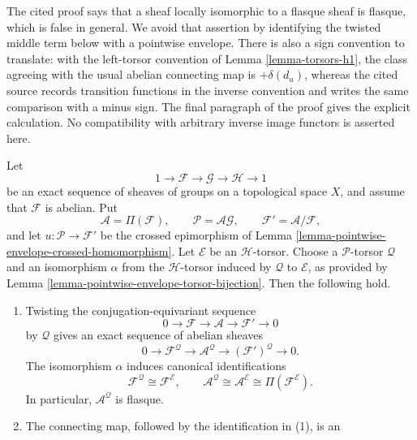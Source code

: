 \begin{lemma}
\label{lemma-pointwise-envelope-degree-two-boundary}
\begin{reference}
\cite[Chapter III, \S 3.4, proof of Proposition 3.4.2 and Remark 1,
pp. 164--165]{Tohoku}
\end{reference}
\begin{history}
The cited proof says that a sheaf locally isomorphic to a flasque sheaf is
flasque, which is false in general. We avoid that assertion by identifying
the twisted middle term below with a pointwise envelope. There is also a
sign convention to translate: with the left-torsor convention of
Lemma \ref{lemma-torsors-h1}, the class agreeing with the usual abelian
connecting map is $+\delta(d_u)$, whereas the cited source records transition
functions in the inverse convention and writes the same comparison with a
minus sign. The final paragraph of the proof gives the explicit calculation.
No compatibility with arbitrary inverse image functors is asserted here.
\end{history}
Let
$$
1\longrightarrow\mathcal F\longrightarrow\mathcal G
\longrightarrow\mathcal H\longrightarrow 1
$$
be an exact sequence of sheaves of groups on a topological space $X$, and
assume that $\mathcal F$ is abelian. Put
$$
\mathcal A=\Pi(\mathcal F),\qquad
\mathcal P=\mathcal A\mathcal G,\qquad
\mathcal F'=\mathcal A/\mathcal F,
$$
and let $u:\mathcal P\to\mathcal F'$ be the crossed epimorphism of
Lemma \ref{lemma-pointwise-envelope-crossed-homomorphism}. Let $\mathcal E$
be an $\mathcal H$-torsor. Choose a $\mathcal P$-torsor $\mathcal Q$ and an
isomorphism $\alpha$ from the $\mathcal H$-torsor induced by $\mathcal Q$ to
$\mathcal E$, as provided by
Lemma \ref{lemma-pointwise-envelope-torsor-bijection}. Then the following
hold.
\begin{enumerate}
\item Twisting the conjugation-equivariant sequence
$$
0\longrightarrow\mathcal F\longrightarrow\mathcal A
\longrightarrow\mathcal F'\longrightarrow 0
$$
by $\mathcal Q$ gives an exact sequence of abelian sheaves
$$
0\longrightarrow\mathcal F^{\mathcal Q}
\longrightarrow\mathcal A^{\mathcal Q}
\longrightarrow(\mathcal F')^{\mathcal Q}\longrightarrow 0.
$$
The isomorphism $\alpha$ induces canonical identifications
$$
\mathcal F^{\mathcal Q}\cong\mathcal F^{\mathcal E},
\qquad
\mathcal A^{\mathcal Q}\cong\mathcal A^{\mathcal E}
\cong\Pi(\mathcal F^{\mathcal E}).
$$
In particular, $\mathcal A^{\mathcal Q}$ is flasque.
\item The connecting map, followed by the identification in (1), is an

\end{enumerate}
\end{lemma}
